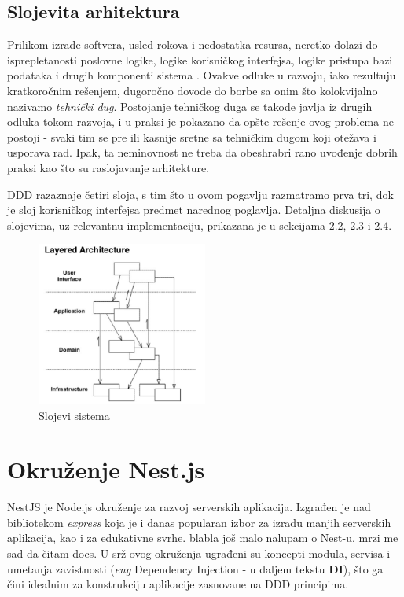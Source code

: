 \documentclass[12pt,oneside]{memoir}
\begin{document}
\subsection{Slojevita arhitektura}
Prilikom izrade softvera, usled rokova i nedostatka resursa, neretko dolazi do isprepletanosti poslovne logike, logike korisničkog interfejsa, logike pristupa bazi podataka i drugih komponenti sistema \cite{dddfull}. Ovakve odluke u razvoju, iako rezultuju kratkoročnim rešenjem, dugoročno dovode do borbe sa onim što kolokvijalno nazivamo \textit{tehnički dug}. Postojanje tehničkog duga se takođe javlja iz drugih odluka tokom razvoja, i u praksi je pokazano da opšte rešenje ovog problema ne postoji - svaki tim se pre ili kasnije sretne sa tehničkim dugom koji otežava i usporava rad. Ipak, ta neminovnost ne treba da obeshrabri rano uvođenje dobrih praksi kao što su raslojavanje arhitekture. 

DDD razaznaje četiri sloja, s tim što u ovom pogavlju razmatramo prva tri, dok je sloj korisničkog interfejsa predmet narednog poglavlja. Detaljna diskusija o slojevima, uz relevantnu implementaciju, prikazana je u sekcijama 2.2, 2.3 i 2.4.

\begin{figure}[h]
  \centering
  \includegraphics[width=0.5\textwidth]{docs/images/ch_2/DDD-Layered-Architecture-2.png} 
  \caption{Slojevi sistema \cite{dddfull}}
  \label{fig:sample}
\end{figure}

\section{Okruženje Nest.js}

NestJS \cite{nestjsdocs} je Node.js okruženje za razvoj serverskih aplikacija. Izgrađen je nad bibliotekom \textit{express} \cite{expressjsdocs} koja je i danas popularan izbor za izradu manjih serverskih aplikacija, kao i za edukativne svrhe. blabla još malo nalupam o Nest-u, mrzi me sad da čitam docs. U srž ovog okruženja ugrađeni su koncepti modula, servisa i umetanja zavistnosti (\textit{eng} Dependency Injection - u daljem tekstu \textbf{DI}), što ga čini idealnim za konstrukciju aplikacije zasnovane na DDD principima.
\end{document}
